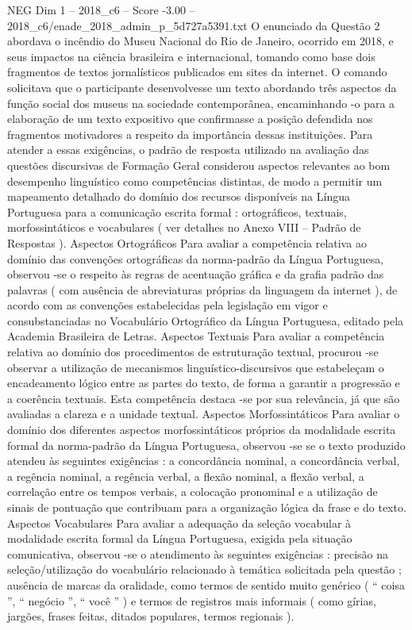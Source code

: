 \begin{textsample}{NEG Dim 1 – 2018\_c6 – Score -3.00 – 2018\_c6/enade\_2018\_admin\_p\_5d727a5391.txt}
O enunciado da Questão 2 abordava o incêndio do Museu Nacional do Rio de Janeiro, ocorrido em 2018, e seus impactos na ciência brasileira e internacional, tomando como base dois fragmentos de textos jornalísticos publicados em sites da internet.
O comando solicitava que o participante desenvolvesse um texto abordando três aspectos da função social dos museus na sociedade contemporânea, encaminhando -o para a elaboração de um texto expositivo que confirmasse a posição defendida nos fragmentos motivadores a respeito da importância dessas instituições.
Para atender a essas exigências, o padrão de resposta utilizado na avaliação das questões discursivas de Formação Geral considerou aspectos relevantes ao bom desempenho linguístico como competências distintas, de modo a permitir um mapeamento detalhado do domínio dos recursos disponíveis na Língua Portuguesa para a comunicação escrita formal : ortográficos, textuais, morfossintáticos e vocabulares ( ver detalhes no Anexo VIII – Padrão de Respostas ).
Aspectos Ortográficos Para avaliar a competência relativa ao domínio das convenções ortográficas da norma-padrão da Língua Portuguesa, observou -se o respeito às regras de acentuação gráfica e da grafia padrão das palavras ( com ausência de abreviaturas próprias da linguagem da internet ), de acordo com as convenções estabelecidas pela legislação em vigor e consubstanciadas no Vocabulário Ortográfico da Língua Portuguesa, editado pela Academia Brasileira de Letras.
Aspectos Textuais Para avaliar a competência relativa ao domínio dos procedimentos de estruturação textual, procurou -se observar a utilização de mecanismos linguístico-discursivos que estabeleçam o encadeamento lógico entre as partes do texto, de forma a garantir a progressão e a coerência textuais.
Esta competência destaca -se por sua relevância, já que são avaliadas a clareza e a unidade textual.
Aspectos Morfossintáticos Para avaliar o domínio dos diferentes aspectos morfossintáticos próprios da modalidade escrita formal da norma-padrão da Língua Portuguesa, observou -se se o texto produzido atendeu às seguintes exigências : a concordância nominal, a concordância verbal, a regência nominal, a regência verbal, a flexão nominal, a flexão verbal, a correlação entre os tempos verbais, a colocação pronominal e a utilização de sinais de pontuação que contribuam para a organização lógica da frase e do texto.
Aspectos Vocabulares Para avaliar a adequação da seleção vocabular à modalidade escrita formal da Língua Portuguesa, exigida pela situação comunicativa, observou -se o atendimento às seguintes exigências : precisão na seleção/utilização do vocabulário relacionado à temática solicitada pela questão ; ausência de marcas da oralidade, como termos de sentido muito genérico ( “ coisa ”, “ negócio ”, “ você ” ) e termos de registros mais informais ( como gírias, jargões, frases feitas, ditados populares, termos regionais ).

\end{textsample}
